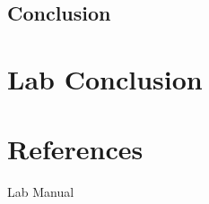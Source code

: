 \documentclass[11pt]{article}
\let\oldsection\section
\renewcommand\section{\clearpage\oldsection}
\begin{document}
    \subsection{Conclusion}\label{subsec:part_3_conclusion}

    \section{Lab Conclusion}\label{sec:lab_conclusion}
    

    \appendix
    \section{References}\label{sec:references}

    Lab Manual
\end{document}
